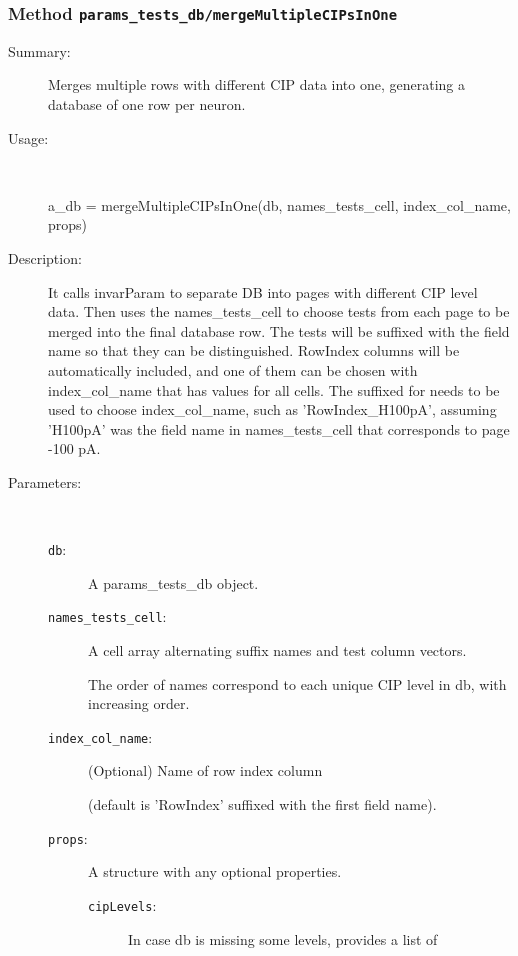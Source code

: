 \subsubsection[Method \texttt{mergeMultipleCIPsInOne}]{Method \texttt{params\_tests\_db/mergeMultipleCIPsInOne}}%
%
\label{ref_params_tests_db__mergeMultipleCIPsInOne}%
\hypertarget{ref_params_tests_db__mergeMultipleCIPsInOne}{}%
\begin{description}
\item[Summary:]Merges multiple rows with different CIP data into one, generating a database of one row per neuron.
%
\item[Usage:]~%
\begin{lyxcode}%
a\_db = mergeMultipleCIPsInOne(db, names\_tests\_cell, index\_col\_name, props)
%
\end{lyxcode}%
%
\item[Description:]%
It calls invarParam to separate DB into pages with different CIP level
 data.  Then uses the names\_tests\_cell to choose tests from each page to be
 merged into the final database row. The tests will be suffixed with the
 field name so that they can be distinguished. RowIndex columns will be
 automatically included, and one of them can be chosen with index\_col\_name
 that has values for all cells. The suffixed for needs to be used to choose
 index\_col\_name, such as 'RowIndex\_H100pA', assuming 'H100pA' was the field
 name in names\_tests\_cell that corresponds to page -100 pA.
\item[Parameters:]~
\begin{description}%
\item[\texttt{db}:]
 A params\_tests\_db object.
\item[\texttt{names\_tests\_cell}:]
 A cell array alternating suffix names and test column vectors.

The order of names correspond to each unique CIP level in db, 
with increasing order.
\item[\texttt{index\_col\_name}:]
 (Optional) Name of row index column 

(default is 'RowIndex' suffixed with the first field name).
\item[\texttt{props}:]
 A structure with any optional properties.
\begin{description}%
\item[\texttt{cipLevels}:]
 In case db is missing some levels, provides a list of 


\end{description}
\end{description}
\end{description}
